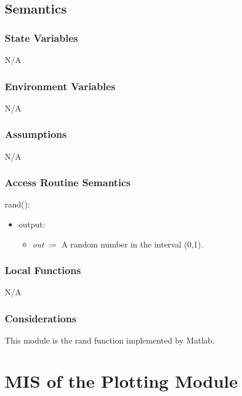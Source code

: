 \documentclass[12pt, titlepage]{article}
\begin{document}
\subsection{Semantics}

\subsubsection{State Variables}

N/A

\subsubsection{Environment Variables}

N/A

\subsubsection{Assumptions}

N/A

\subsubsection{Access Routine Semantics}

rand():
\begin{itemize}
	\item output: 
	\begin{itemize}
		\item[] \textit{out} $\coloneqq$ A random number in the interval (0,1).
	\end{itemize}
\end{itemize}

\subsubsection{Local Functions}

N/A

\subsubsection{Considerations}
This module is the rand function implemented by Matlab.


\section{MIS of the Plotting Module} \label{sec:Plotting}
\end{document}

